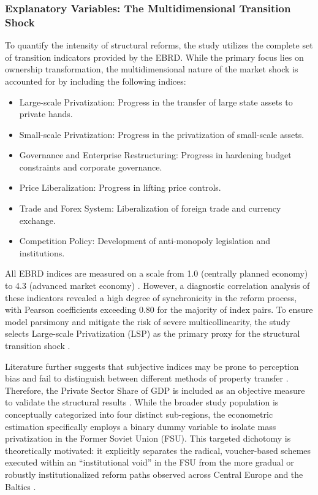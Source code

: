 \documentclass[en,magisterska]{pracamgr}
\begin{document}
\subsubsection*{Explanatory Variables: The Multidimensional Transition Shock}
To quantify the intensity of structural reforms, the study utilizes the complete set of transition indicators provided by the EBRD. 
While the primary focus lies on ownership transformation, the multidimensional nature of the market shock is accounted for by including 
the following indices:

\begin{itemize}
    \item Large-scale Privatization: Progress in the transfer of large state assets to private hands.
    \item Small-scale Privatization: Progress in the privatization of small-scale assets.
    \item Governance and Enterprise Restructuring: Progress in hardening budget constraints and corporate governance.
    \item Price Liberalization: Progress in lifting price controls.
    \item Trade and Forex System: Liberalization of foreign trade and currency exchange.
    \item Competition Policy: Development of anti-monopoly legislation and institutions.
\end{itemize}

All EBRD indices are measured on a scale from 1.0 (centrally planned economy) to 4.3 (advanced market economy) \citep{Stuckler2009, EBRD1999}. 
However, a diagnostic correlation analysis of these indicators revealed a high degree of synchronicity in the reform process, with Pearson coefficients 
exceeding 0.80 for the majority of index pairs. To ensure model parsimony and mitigate the risk of severe multicollinearity, the study selects Large-scale 
Privatization (LSP) as the primary proxy for the structural transition shock \citep{Gerry2010}.

Literature further suggests that subjective indices may be prone to perception bias and fail to distinguish between different methods of property transfer 
\citep{Hamm2012, Stuckler2009}. Therefore, the Private Sector Share of GDP is included as an objective measure to validate the structural results \citep{Hamm2012, Bennett2007}. 
While the broader study population is conceptually categorized into four distinct sub-regions, the econometric estimation specifically employs a binary dummy variable to isolate 
mass privatization in the Former Soviet Union (FSU). This targeted dichotomy is theoretically motivated: it explicitly separates the radical, voucher-based schemes executed 
within an ``institutional void'' in the FSU from the more gradual or robustly institutionalized reform paths observed across Central Europe and the Baltics 
\citep{Estrin2004, Earle2013, Roland2000, King2001}.
\end{document}
